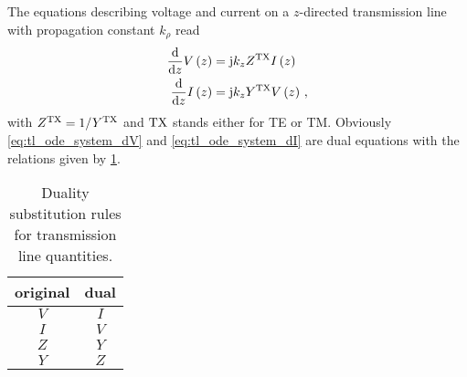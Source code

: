 The equations describing voltage and current on a $z$-directed transmission line with propagation constant $k_\rho$ read \cite{Felsen1994} \cite{Michalski2016b}
\begin{subequations}\label{eq:tl_ode_system}
	\begin{align}
		\frac{\mathrm{d}}{\mathrm{d} z} V\left(z\right) &= \mathrm{j} k_z Z^{\mathrm{TX}} I\left(z\right) \label{eq:tl_ode_system_dV} \\
		\frac{\mathrm{d}}{\mathrm{d} z} I\left(z\right) &= \mathrm{j} k_z Y^{\mathrm{TX}} V\left(z\right) \label{eq:tl_ode_system_dI} \, ,
	\end{align}
\end{subequations}
with $Z^{\mathrm{TX}} = 1/Y^{\mathrm{TX}}$ and $\mathrm{TX}$ stands either for \ac{TE} or \ac{TM}. Obviously \eqref{eq:tl_ode_system_dV} and \eqref{eq:tl_ode_system_dI} are dual equations with the relations given by \cref{tab:tl_duality}.

\begin{table}[hbt]
	\centering
	\begin{tabular}{cc}
		\toprule%
		\textbf{original} & \textbf{dual}\\ \midrule
		$V$ & $I$ \\
		$I$ & $V$ \\
		$Z$ & $Y$ \\
		$Y$ & $Z$ \\
		\bottomrule
	\end{tabular}
	\caption[Duality substitution rules for transmission line quantities]{Duality substitution rules for transmission line quantities.}
	\label{tab:tl_duality}
\end{table}



